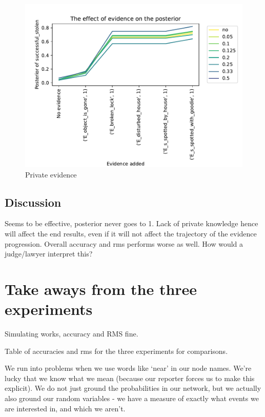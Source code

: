 \begin{figure}[h!]
\begin{center}
\includegraphics[width=\linewidth]{../experiments/StolenLaptopPrivate/plots/posterior_StolenLaptopPrivate.pdf}
\caption{Private evidence}
\label{privatelaptopPosterior}
\end{center}
\end{figure}


\subsection{Discussion}

Seems to be effective, posterior never goes to 1. Lack of private knowledge hence will affect the end results, even if it will not affect the trajectory of the evidence progression. Overall accuracy and rms performs worse as well.
How would a judge/lawyer interpret this?


\section{Take aways from the three experiments}



Simulating works, accuracy and RMS fine.

Table of accuracies and rms for the three experiments for comparisons.

We run into problems when we use words like `near' in our node names. We're lucky that we know what we mean (because our reporter forces us to make this explicit). We do not just ground the probabilities in our network, but we actually also ground our random variables - we have a measure of exactly what events we are interested in, and which we aren't.

